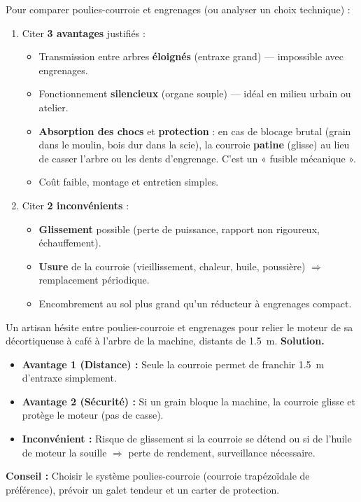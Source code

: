 \documentclass[11pt]{article}
\newcounter{popsec}
\newcounter{popsub}
\newcommand{\courssub}[1]{%
  \stepcounter{popsub}%
  \par\vspace{9pt}\noindent{\popxbold\fontsize{11.5}{13}\selectfont\color{popink}{\color{poporange}\thepopsec.\thepopsub}\hspace{6pt}#1}\par\nopagebreak\vspace{4pt}
}
\begin{document}
\courssub{Avantages et inconvénients}

\begin{methode}
Pour comparer poulies-courroie et engrenages (ou analyser un choix technique) :
\begin{enumerate}
\item Citer \textbf{3 avantages} justifiés :
\begin{itemize}
\item Transmission entre arbres \textbf{éloignés} (entraxe grand) — impossible avec engrenages.
\item Fonctionnement \textbf{silencieux} (organe souple) — idéal en milieu urbain ou atelier.
\item \textbf{Absorption des chocs} et \textbf{protection} : en cas de blocage brutal (grain dans le moulin, bois dur dans la scie), la courroie \textbf{patine} (glisse) au lieu de casser l'arbre ou les dents d'engrenage. C'est un « fusible mécanique ».
\item Coût faible, montage et entretien simples.
\end{itemize}
\item Citer \textbf{2 inconvénients} :
\begin{itemize}
\item \textbf{Glissement} possible (perte de puissance, rapport non rigoureux, échauffement).
\item \textbf{Usure} de la courroie (vieillissement, chaleur, huile, poussière) $\Rightarrow$ remplacement périodique.
\item Encombrement au sol plus grand qu'un réducteur à engrenages compact.
\end{itemize}
\end{enumerate}
\end{methode}

\begin{exoresolu}
Un artisan hésite entre poulies-courroie et engrenages pour relier le moteur de sa décortiqueuse à café à l'arbre de la machine, distants de \SI{1,5}{m}.
\tcblower
\textbf{Solution.}
\begin{itemize}
\item \textbf{Avantage 1 (Distance) :} Seule la courroie permet de franchir \SI{1,5}{m} d'entraxe simplement.
\item \textbf{Avantage 2 (Sécurité) :} Si un grain bloque la machine, la courroie glisse et protège le moteur (pas de casse).
\item \textbf{Inconvénient :} Risque de glissement si la courroie se détend ou si de l'huile de moteur la souille $\Rightarrow$ perte de rendement, surveillance nécessaire.
\end{itemize}
\textbf{Conseil :} Choisir le système poulies-courroie (courroie trapézoïdale de préférence), prévoir un galet tendeur et un carter de protection.
\end{exoresolu}
\end{document}
